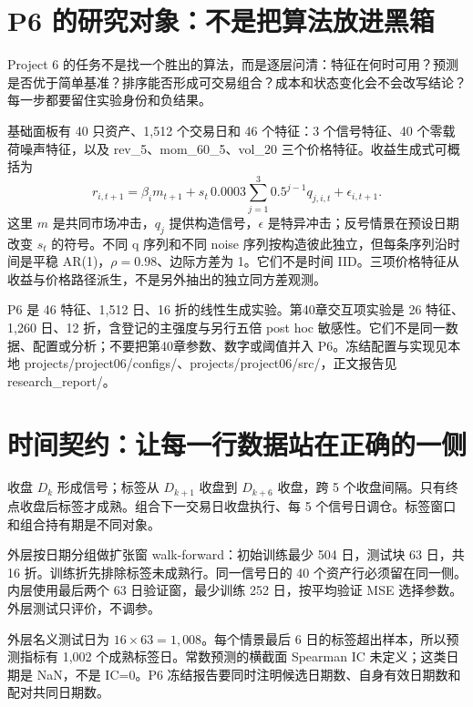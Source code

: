 \clearpage\section{P6 的研究对象：不是把算法放进黑箱}
\color{inkiron}
\begin{strand}
Project 6 的任务不是找一个胜出的算法，而是逐层问清：特征在何时可用？预测是否优于简单基准？排序能否形成可交易组合？成本和状态变化会不会改写结论？每一步都要留住实验身份和负结果。
\end{strand}
\begin{definition}[构造面板与时间过程]
基础面板有 40 只资产、1,512 个交易日和 46 个特征：3 个信号特征、40 个零载荷噪声特征，以及 rev\_5、mom\_60\_5、vol\_20 三个价格特征。收益生成式可概括为
\[
r_{i,t+1}=\beta_i m_{t+1}+s_t\,0.0003\sum_{j=1}^{3}0.5^{j-1}q_{j,i,t}+\epsilon_{i,t+1}.
\]
这里 \(m\) 是共同市场冲击，\(q_j\) 提供构造信号，\(\epsilon\) 是特异冲击；反号情景在预设日期改变 \(s_t\) 的符号。不同 q 序列和不同 noise 序列按构造彼此独立，但每条序列沿时间是平稳 AR(1)，\(\rho=0.98\)、边际方差为 1。它们不是时间 IID。三项价格特征从收益与价格路径派生，不是另外抽出的独立同方差观测。
\end{definition}
P6 是 46 特征、1,512 日、16 折的线性生成实验。第40章交互项实验是 26 特征、1,260 日、12 折，含登记的主强度与另行五倍 post hoc 敏感性。它们不是同一数据、配置或分析；不要把第40章参数、数字或阈值并入 P6。冻结配置与实现见本地 projects/project06/configs/、projects/project06/src/，正文报告见 research\_report/。


\clearpage\section{时间契约：让每一行数据站在正确的一侧}
\begin{strand}
收盘 \(D_k\) 形成信号；标签从 \(D_{k+1}\) 收盘到 \(D_{k+6}\) 收盘，跨 5 个收盘间隔。只有终点收盘后标签才成熟。组合下一交易日收盘执行、每 5 个信号日调仓。标签窗口和组合持有期是不同对象。
\end{strand}
\begin{proposition}[外层与内层验证]
外层按日期分组做扩张窗 walk-forward：初始训练最少 504 日，测试块 63 日，共 16 折。训练折先排除标签未成熟行。同一信号日的 40 个资产行必须留在同一侧。内层使用最后两个 63 日验证窗，最少训练 252 日，按平均验证 MSE 选择参数。外层测试只评价，不调参。
\end{proposition}
外层名义测试日为 \(16\times63=1{,}008\)。每个情景最后 6 日的标签超出样本，所以预测指标有 1,002 个成熟标签日。常数预测的横截面 Spearman IC 未定义；这类日期是 NaN，不是 IC=0。P6 冻结报告要同时注明候选日期数、自身有效日期数和配对共同日期数。

